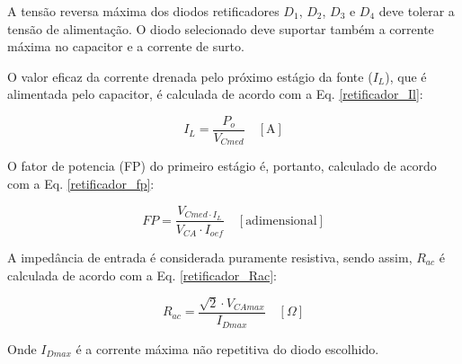 \begin{apendicesenv}
A tensão reversa máxima dos diodos retificadores $D_{1}$, $D_{2}$, $D_{3}$ e $D_{4}$ deve tolerar a tensão de alimentação. O diodo selecionado deve suportar também a corrente máxima no capacitor e a corrente de surto.

O valor eficaz da corrente drenada pelo próximo estágio da fonte ($I_{L}$), que é alimentada pelo capacitor, é calculada de acordo com a Eq. \ref{retificador_Il}:

    \begin{equation}
        I_{L} = \frac{P_{o}}{V_{Cmed}} \quad [\text{A}]
        \label{retificador_Il}
    \end{equation}

O fator de potencia (FP) do primeiro estágio é, portanto, calculado de acordo com a Eq. \ref{retificador_fp}:

    \begin{equation}
        FP = \frac{V_{Cmed \cdot I_{L}}}{ V_{CA} \cdot I_{oef}} \quad [\text{adimensional}]
        \label{retificador_fp}
    \end{equation}

A impedância de entrada é considerada puramente resistiva, sendo assim, $R_{ac}$ é calculada de acordo com a Eq. \ref{retificador_Rac}:

    \begin{equation}
        R_{ac} = \frac{\sqrt{2} \cdot V_{CAmax}}{I_{Dmax}} \quad [\Omega]
        \label{retificador_Rac}
    \end{equation}
    
Onde $I_{Dmax}$ é a corrente máxima não repetitiva do diodo escolhido. 


\end{apendicesenv}
